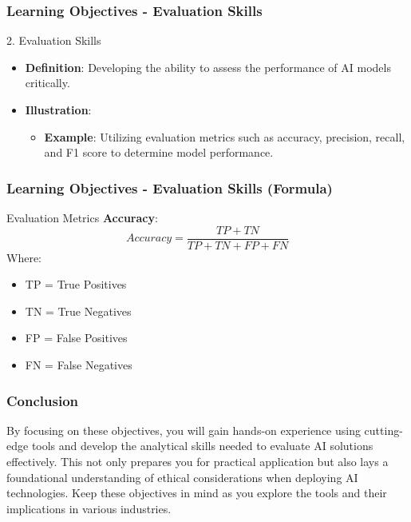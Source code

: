 \documentclass[aspectratio=169]{beamer}
\begin{document}
\begin{frame}
    \frametitle{Learning Objectives - Evaluation Skills}
    \begin{block}{2. Evaluation Skills}
        \begin{itemize}
            \item \textbf{Definition}: Developing the ability to assess the performance of AI models critically.
            \item \textbf{Illustration}:
                \begin{itemize}
                    \item \textbf{Example}: Utilizing evaluation metrics such as accuracy, precision, recall, and F1 score to determine model performance.
                \end{itemize}
        \end{itemize}
    \end{block}
\end{frame}

\begin{frame}
    \frametitle{Learning Objectives - Evaluation Skills (Formula)}
    \begin{block}{Evaluation Metrics}
        \textbf{Accuracy}:
        \begin{equation}
            Accuracy = \frac{TP + TN}{TP + TN + FP + FN}
        \end{equation}
        Where:
        \begin{itemize}
            \item TP = True Positives
            \item TN = True Negatives
            \item FP = False Positives
            \item FN = False Negatives
        \end{itemize}
    \end{block}
\end{frame}

\begin{frame}
    \frametitle{Conclusion}
    By focusing on these objectives, you will gain hands-on experience using cutting-edge tools and develop the analytical skills needed to evaluate AI solutions effectively. This not only prepares you for practical application but also lays a foundational understanding of ethical considerations when deploying AI technologies.
    Keep these objectives in mind as you explore the tools and their implications in various industries.
\end{frame}
\end{document}
